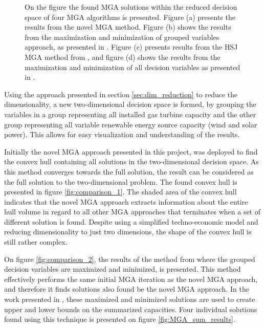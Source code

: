 \begin{figure}[h]
\begin{subfigure}{.5\textwidth}
		\caption{}
		\label{fig:comparison_4}
	\end{subfigure}
	\caption{On the figure the found MGA solutions within the reduced decision space of four MGA algorithms is presented. Figure (a) presents the results from the novel MGA method. Figure (b) shows the results from the maximization and minimization of grouped variables approach, as presented in \cite{Fabian_MGA}. Figure (c) presents results from the HSJ MGA method from \cite{DeCarolis_MGA}, and figure (d) shows the results from the maximization and minimization of all decision variables as presented in \cite{Fabian_MGA}.}
	\label{fig:comparison_results}
\end{figure}

Using the approach presented in section \ref{sec:dim_reduction} to reduce the dimensionality, a new two-dimensional decision space is formed, by grouping the variables in a group representing all installed gas turbine capacity and the other group representing all variable renewable energy source capacity (wind and solar power). This allows for easy visualization and understanding of the results. 

Initially the novel MGA approach presented in this project, was deployed to find the convex hull containing all solutions in the two-dimensional decision space. As this method converges towards the full solution, the result can be considered as the full solution to the two-dimensional problem. The found convex hull is presented in figure \ref{fig:comparison_1}. The shaded area of the convex hull indicates that the novel MGA approach extracts information about the entire hull volume in regard to all other MGA approaches that terminates when a set of different solution is found. Despite using a simplified techno-economic model and reducing dimensionality to just two dimensions, the shape of the convex hull is still rather complex. 

 



On figure \ref{fig:comparison_2}, the results of the method from \cite{Fabian_MGA} where the grouped decision variables are maximized and minimized, is presented. This method effectively performs the same initial MGA iteration as the novel MGA approach, and therefore it finds solutions also found be the novel MGA approach. In the work presented in \cite{Fabian_MGA}, these maximized and minimized solutions are used to create upper and lower bounds on the summarized capacities. Four individual solutions found using this technique is presented on figure \ref{fig:MGA_sum_results}. 


